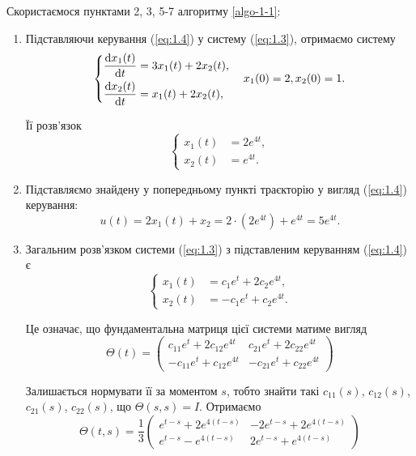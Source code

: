 \begin{solution}
    Скористаємося пунктами 2, 3, 5-7 алгоритму \ref{algo-1-1}:
    
	\begin{enumerate}
		\item Підставляючи керування (\ref{eq:1.4}) у систему (\ref{eq:1.3}), отримаємо систему \[
		\left\{
			\begin{aligned}
				\frac{\mathop{}\!\mathrm{d} x_1 (t)}{\mathop{}\!\mathrm{d} t} &= 3 x_1 (t) + 2 x_2 (t), \\
				\frac{\mathop{}\!\mathrm{d} x_2 (t)}{\mathop{}\!\mathrm{d} t} &= x_1 (t) + 2 x_2 (t),
			\end{aligned}
		\right.
		\quad
		x_1 (0) = 2, x_2 (0) = 1.
		\]

		Її розв'язок \[
		\left\{
			\begin{aligned}
				x_1 (t) &= 2 e^{4 t}, \\
				x_2 (t) &= e^{4 t}.
			\end{aligned}
		\right.
		\]

		\item Підставляємо знайдену у попередньому пункті траєкторію у вигляд (\ref{eq:1.4}) керування: \[ u(t) = 2 x_1 (t) + x_2 = 2 \cdot \left( 2 e^{4 t} \right) + e^{4 t} = 5 e^{4 t}. \]

		\item Загальним розв'язком системи (\ref{eq:1.3}) з підставленим керуванням (\ref{eq:1.4}) є \[
		\left\{
			\begin{aligned}
				x_1 (t) &= c_1 e^t + 2 c_2 e^{4 t}, \\
				x_2 (t) &= - c_1 e^t + c_2 e^{4 t}.
			\end{aligned}
		\right.
		\]

		Це означає, що фундаментальна матриця цієї системи матиме вигляд \[
			\Theta(t) = 
			\begin{pmatrix}
				c_{11} e^t + 2 c_{12} e^{4 t} & c_{21} e^t + 2 c_{22} e^{4 t} \\
				- c_{11} e^t + c_{12} e^{4 t} & - c_{21} e^t + c_{22} e^{4 t}
			\end{pmatrix}
		\]

		Залишається нормувати її за моментом $s$, тобто знайти такі $c_{11} (s)$, $c_{12} (s)$, $c_{21} (s)$, $c_{22} (s)$, що $\Theta(s, s) = I$. Отримаємо \[
			\Theta(t, s) = \frac{1}{3}
			\begin{pmatrix}
				e^{t - s} + 2 e^{4 (t - s)} & -2 e^{t - s} + 2 e^{4 (t - s)} \\
				e^{t - s} - e^{4 (t - s)} & 2 e^{t - s} + e^{4 (t - s)}
			\end{pmatrix}
		\]


\end{enumerate}
\end{solution}

